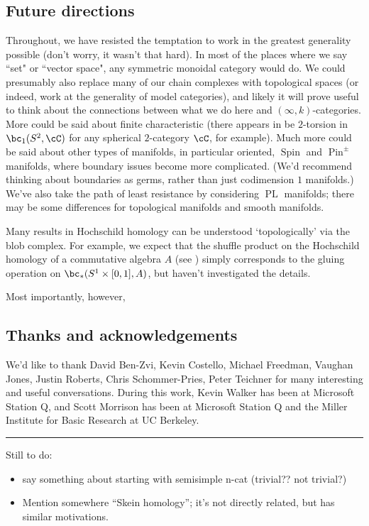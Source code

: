 \subsection{Future directions}
\label{sec:future}
Throughout, we have resisted the temptation to work in the greatest generality possible (don't worry, it wasn't that hard). 
In most of the places where we say ``set" or ``vector space", any symmetric monoidal category would do. We could presumably also replace many of our chain complexes with topological spaces (or indeed, work at the generality of model categories), and likely it will prove useful to think about the connections between what we do here and $(\infty,k)$-categories.
More could be said about finite characteristic (there appears in be $2$-torsion in $\bc_1(S^2, \cC)$ for any spherical $2$-category $\cC$, for example). Much more could be said about other types of manifolds, in particular oriented, $\operatorname{Spin}$ and $\operatorname{Pin}^{\pm}$ manifolds, where boundary issues become more complicated. (We'd recommend thinking about boundaries as germs, rather than just codimension $1$ manifolds.) We've also take the path of least resistance by considering $\operatorname{PL}$ manifolds; there may be some differences for topological manifolds and smooth manifolds.

Many results in Hochschild homology can be understood `topologically' via the blob complex. For example, we expect that the shuffle product on the Hochschild homology of a commutative algebra $A$ (see \cite[\S 4.2]{MR1600246}) simply corresponds to the gluing operation on $\bc_*(S^1 \times [0,1], A)$, but haven't investigated the details.

Most importantly, however,  


\subsection{Thanks and acknowledgements}
We'd like to thank David Ben-Zvi, Kevin Costello, 
Michael Freedman, Vaughan Jones, Justin Roberts, Chris Schommer-Pries, Peter Teichner  for many interesting and useful conversations. 
During this work, Kevin Walker has been at Microsoft Station Q, and Scott Morrison has been at Microsoft Station Q and the Miller Institute for Basic Research at UC Berkeley.


\medskip\hrule\medskip

Still to do:
\begin{itemize}
\item say something about starting with semisimple n-cat (trivial?? not trivial?)
\item Mention somewhere \cite{MR1624157} ``Skein homology''; it's not directly related, but has similar motivations.
\end{itemize}

